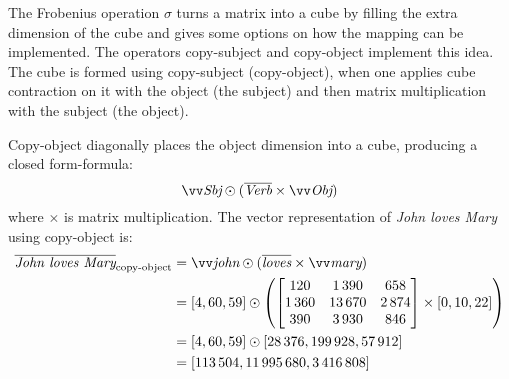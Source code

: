 The Frobenius operation $\sigma$ turns a matrix into a cube by filling the extra dimension of the cube and gives some options on how the mapping can be implemented. The operators copy-subject and copy-object \cite{kartsaklis-sadrzadeh-pulman:2012:POSTERS} implement this idea. The cube is formed using copy-subject (copy-object), when one applies cube contraction on it with the object (the subject) and then matrix multiplication with the subject (the object).

Copy-object diagonally places the object dimension into a cube, producing a closed form-formula:
%
\begin{equation}
  \ov{\text{\it Sbj}} \odot (\overline{\text{\it Verb}} \times \ov{\text{\it Obj}})
\end{equation}
%
where $\times$ is matrix multiplication. The vector representation of \textit{John loves Mary} using copy-object is:
%
\begin{align*}
  \overline{\text{\it John loves Mary}}_{\text{copy-object}} &=\ov{\text{\it john}} \odot (\overline{\text{\it loves}} \times \ov{\text{\it mary}}) \\
                                                       &= [4, 60, 59]%
                                                         \odot \left(%
                                                         \begin{bmatrix}
                                                           120 &  1\,390 &    658 \\
                                                           1\,360 & 13\,670 & 2\,874 \\
                                                           390 &  3\,930 &    846
                                                         \end{bmatrix} %
                                                         \times%
                                                         [0, 10, 22]%
                                                                           \right) \\
                                                       &= [4, 60, 59] \odot [28\,376, 199\,928,  57\,912] \\
                                                       &= [113\,504, 11\,995\,680,  3\,416\,808]
\end{align*}


